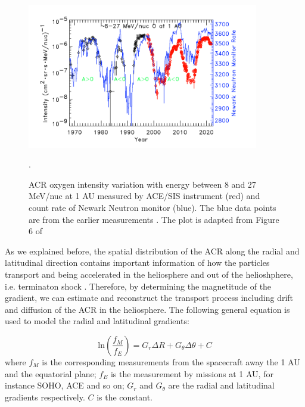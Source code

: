 

\begin{figure}
	\centering
	\includegraphics[width = 0.9\textwidth]{images/ACR_solarmodulation.png}
	\caption[Long term variation of \ac{ACR} oxygen and neutron monitor count rate]{ACR oxygen intensity variation with energy between 8 and 27 MeV/nuc at 1 AU measured by ACE/SIS instrument (red) and count rate of Newark Neutron monitor (blue). The blue data points are from the earlier measurements \citep{Mewaldt1993GeoRL}. The plot is adapted from Figure 6 of \citet{Giacalone2022SSRv}}.
	\label{Fig:ACR_solarmodulation}
\end{figure}


As we explained before, the spatial distribution of the \ac{ACR} along the radial and latitudinal direction contains important information of how the particles transport and being accelerated in the heliosphere and out of the helioshphere, i.e. terminaton shock \cite{Rankin2021ApJ}.  Therefore, by determining the magnetitude of the gradient, we can estimate and reconstruct the transport process including drift and diffusion of the \ac{ACR} in the heliosphere. The following general equation is used to model the radial and latitudinal gradients:

\begin{equation}
	\mathrm{ln}(\frac{f_{M}}{f_{E}}) = G_r \Delta R  + G_{\theta} \Delta \theta + C
\end{equation}
where $f_{M}$ is the corresponding measurements from the spacecraft away the 1 AU and the equatorial plane; $f_{E}$ is the measurement by missions at 1 AU, for instance SOHO, ACE and so on; $G_r$ and $G_{\theta}$ are the radial and latitudinal gradients respectively. $C$ is the constant.

